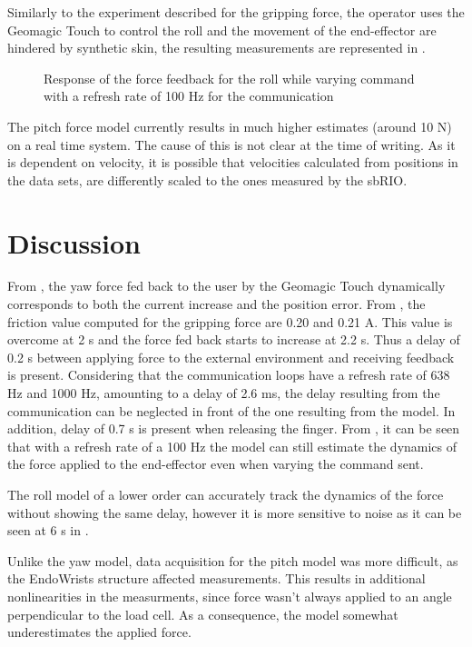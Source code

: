 Similarly to the experiment described for the gripping force, the operator uses the Geomagic Touch to control the roll and the movement of the end-effector are hindered by synthetic skin, the resulting measurements are represented in .
\begin{figure}[H]
  
  \caption{Response of the force feedback for the roll while varying command with a refresh rate of 100 Hz for the communication}
  \label{fig:fbkm_roll_100}
\end{figure}

The pitch force model currently results in much higher estimates (around 10 N) on a real time system. The cause of this is not clear at the time of writing. As it is dependent on velocity, it is possible that velocities calculated from positions in the data sets, are differently scaled to the ones measured by the sbRIO.



\section{Discussion}


From , the yaw force fed back to the user by the Geomagic Touch dynamically corresponds to both the current increase and the position error. From , the friction value computed for the gripping force are 0.20 and 0.21 A. This value is overcome at 2 s and the force fed back starts to increase at 2.2 s. Thus a delay of 0.2 s between applying force to the external environment and receiving feedback is present. Considering that the communication loops have a refresh rate of 638 Hz and 1000 Hz, amounting to a delay of 2.6 ms, the delay resulting from the communication can be neglected in front of the one resulting from the model. In addition, delay of 0.7 s is present when releasing the finger.
From , it can be seen that with a refresh rate of a 100 Hz the model can still estimate the dynamics of the force applied to the end-effector even when varying the command sent.

The roll model of a lower order can accurately track the dynamics of the force without showing the same delay, however it is more sensitive to noise as it can be seen at 6 s in .

Unlike the yaw model, data acquisition for the pitch model was more difficult, as the EndoWrists structure affected measurements.
This results in additional nonlinearities in the measurments, since force wasn't always applied to an angle perpendicular to the load cell.
As a consequence, the model somewhat underestimates the applied force.

